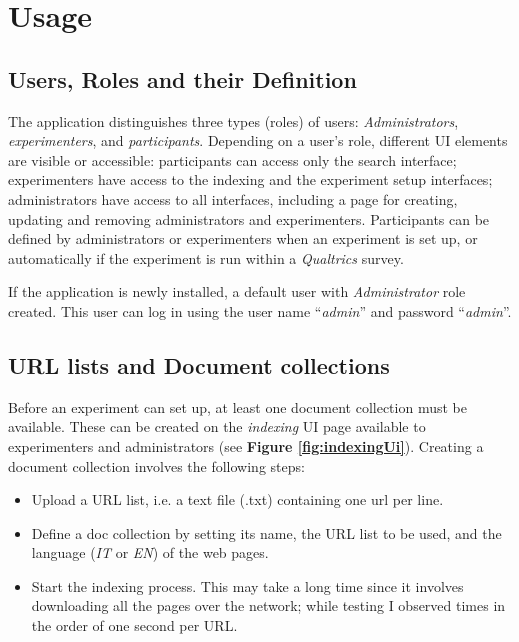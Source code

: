 \documentclass[fleqn]{article}
\begin{document}
\section{Usage}
\label{sec:usage}

\subsection{Users, Roles and their Definition}

The application distinguishes three types (roles) of users: \emph{Administrators}, \emph{experimenters}, and \emph{participants}.
Depending on a user's role, different UI elements are visible or accessible: participants can access only the search interface; 
experimenters have access to the indexing and the experiment setup interfaces; administrators have access to all interfaces,
including a page for creating, updating and removing administrators and experimenters. Participants can be defined
by administrators or experimenters when an experiment is set up, or automatically if the experiment is run within
a \emph{Qualtrics} survey.

If the application is newly installed, a default user with \emph{Administrator} role created. This user can log in using
the user name ``\emph{admin}'' and password ``\emph{admin}''.

\subsection{URL lists and Document collections}

Before an experiment can set up, at least one document collection must be available. These can be created on the \emph{indexing}
UI page available to experimenters and administrators (see \textbf{Figure \ref{fig:indexingUi}}). Creating a document collection involves
the following steps:
\begin{itemize}

\item Upload a URL list, i.e. a text file (.txt) containing one url per line.

\item Define a doc collection by setting its name, the URL list to be used, and the language (\emph{IT} or \emph{EN})
        of the web pages.

\item Start the indexing process. This may take a long time since it involves downloading all the pages over the network;
      while testing I observed times in the order of one second per URL.

\end{itemize}
\end{document}
